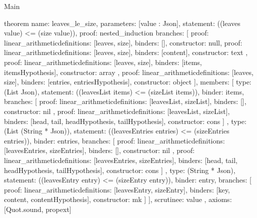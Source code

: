 \begin{lexlean}{Main}
\begin{semanticmodule}
theorem{
  name: leaves_le_size,
  parameters: [value : Json],
  statement: ((leaves value) <= (size value)),
  proof: nested_induction{
    branches: [
      {proof: linear_arithmetic{definitions: [leaves, size]}, binders: [], constructor: null},
      {
        proof: linear_arithmetic{definitions: [leaves, size]},
        binders: [content],
        constructor: text
      },
      {
        proof: linear_arithmetic{definitions: [leaves, size]},
        binders: [items, itemsHypothesis],
        constructor: array
      },
      {
        proof: linear_arithmetic{definitions: [leaves, size]},
        binders: [entries, entriesHypothesis],
        constructor: object
      }
    ],
    members: [
      {
        type: (List Json),
        statement: ((leavesList items) <= (sizeList items)),
        binder: items,
        branches: [
          {
            proof: linear_arithmetic{definitions: [leavesList, sizeList]},
            binders: [],
            constructor: nil
          },
          {
            proof: linear_arithmetic{definitions: [leavesList, sizeList]},
            binders: [head, tail, headHypothesis, tailHypothesis],
            constructor: cons
          }
        ]
      },
      {
        type: (List (String * Json)),
        statement: ((leavesEntries entries) <= (sizeEntries entries)),
        binder: entries,
        branches: [
          {
            proof: linear_arithmetic{definitions: [leavesEntries, sizeEntries]},
            binders: [],
            constructor: nil
          },
          {
            proof: linear_arithmetic{definitions: [leavesEntries, sizeEntries]},
            binders: [head, tail, headHypothesis, tailHypothesis],
            constructor: cons
          }
        ]
      },
      {
        type: (String * Json),
        statement: ((leavesEntry entry) <= (sizeEntry entry)),
        binder: entry,
        branches: [
          {
            proof: linear_arithmetic{definitions: [leavesEntry, sizeEntry]},
            binders: [key, content, contentHypothesis],
            constructor: mk
          }
        ]
      }
    ],
    scrutinee: value
  },
  axioms: [Quot.sound, propext]
}
\end{semanticmodule}
\end{lexlean}
